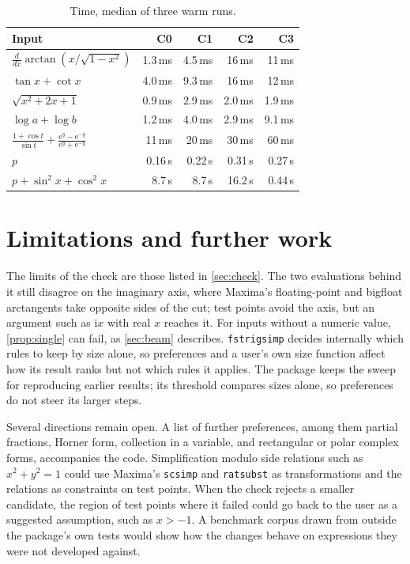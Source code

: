 \documentclass[11pt]{amsart}
\newcommand{\mx}{\lstinline[style=mx]}
\theoremstyle{definition}
\theoremstyle{remark}
\begin{document}
\begin{table}[ht]
\caption{Time, median of three warm runs.}
\label{tab:times}
\small
\begin{tabular}{@{}lrrrr@{}}
\toprule
Input & C0 & C1 & C2 & C3 \\
\midrule
$\frac{d}{dx}\arctan(x/\sqrt{1-x^2})$ & 1.3\,ms & 4.5\,ms & 16\,ms & 11\,ms \\
$\tan x + \cot x$ & 4.0\,ms & 9.3\,ms & 16\,ms & 12\,ms \\
$\sqrt{x^2+2x+1}$ & 0.9\,ms & 2.9\,ms & 2.0\,ms & 1.9\,ms \\
$\log a + \log b$ & 1.2\,ms & 4.0\,ms & 2.9\,ms & 9.1\,ms \\
$\frac{1+\cos t}{\sin t} + \frac{\mathrm{e}^y-\mathrm{e}^{-y}}{\mathrm{e}^y+\mathrm{e}^{-y}}$
  & 11\,ms & 20\,ms & 30\,ms & 60\,ms \\
$p$ & 0.16\,s & 0.22\,s & 0.31\,s & 0.27\,s \\
$p + \sin^2 x + \cos^2 x$ & 8.7\,s & 8.7\,s & 16.2\,s & 0.44\,s \\
\bottomrule
\end{tabular}
\end{table}

\section{Limitations and further work}\label{sec:limits}

The limits of the check are those listed in \cref{sec:check}. The two evaluations behind it still disagree on the
imaginary axis, where Maxima's floating-point and bigfloat arctangents take
opposite sides of the cut; test points avoid the axis, but an argument such
as $\mathrm{i}x$ with real $x$ reaches it. For inputs without a numeric
value, \cref{prop:single} can fail, as \cref{sec:beam} describes.
\mx|fstrigsimp| decides internally which rules to keep by size alone, so
preferences and a user's own size function affect how its result ranks but
not which rules it applies. The package keeps the sweep for reproducing
earlier results; its threshold compares sizes alone, so preferences do not
steer its larger steps.

Several directions remain open. A list of further preferences, among them
partial fractions, Horner form, collection in a variable, and rectangular
or polar complex forms, accompanies the code. Simplification modulo side
relations such as $x^2 + y^2 = 1$ could use Maxima's \mx|scsimp| and
\mx|ratsubst| as transformations and the relations as constraints on test
points. When the check rejects a smaller candidate, the region of test
points where it failed could go back to the user as a suggested
assumption, such as $x > -1$. A benchmark corpus drawn from outside the
package's own tests would show how the changes behave on expressions they
were not developed against.
\end{document}
